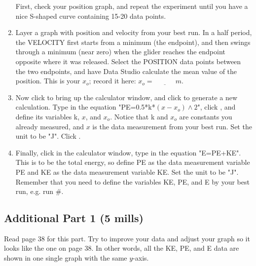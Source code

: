 \documentclass{article}
\begin{document}
\begin{enumerate}

First, check your position graph, and repeat the experiment until you have a nice S-shaped curve containing 15-20 data points.

\item Layer a graph with position and velocity from your best run. In a half period, the VELOCITY first starts from a minimum (the endpoint), and then swings through a minimum (near zero) when the glider reaches the endpoint opposite where it was released. Select the POSITION data points between the two endpoints, and have Data Studio calculate the mean value of the position. This is your $x_o$; record it here: $x_o=\underline{~~~~~~~~~~~~~~}m$.

\item Now click  to bring up the calculator window, and click  to generate a new calculation. Type in the equation "PE=0.5*k*$(x-x_o)\wedge 2$", click , and define its variables k, $x$, and $x_o$. Notice that k and $x_o$ are constants you already measured, and $x$ is the data measurement from your best run. Set the unit to be "J". Click .

\item Finally, click  in the calculator window, type in the equation "E=PE+KE". This is to be the total energy, so define PE as the data measurement variable PE and KE as the data measurement variable KE. Set the unit to be "J". Remember that you need to define the variables KE, PE, and E by your best run, e.g. run $\#$. 


\end{enumerate}

\subsection*{Additional Part 1 (5 mills)}
Read page 38 for this part. Try to improve your data and adjust your graph so it looks like the one on page 38. In other words, all the KE, PE, and E data are shown in one single graph with the same $y$-axis.
\end{document}
